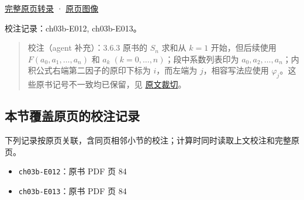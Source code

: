 \documentclass[
  10pt,
  fontset=fandol]{ctexart}
\providecommand{\tightlist}{%
  \setlength{\itemsep}{0pt}\setlength{\parskip}{0pt}}
\begin{document}
\href{../pages/pdf-084.md}{完整原页转录} · \href{../../source-images/pdf-084.jpeg}{原页图像}

校注记录：ch03b-E012, ch03b-E013。

\begin{quote}
校注（agent 补充）：3.6.3 原书的 \(S_n\) 求和从 \(k=1\) 开始，但后续使用 \(F(a_0,a_1,\ldots,a_n)\) 和 \(a_k\;(k=0,\ldots,n)\)；段中系数列表印为 \(a_0,a_2,\ldots,a_n\)；内积公式右端第二因子的原印下标为 \(i\)，而左端为 \(j\)，相容写法应使用 \(\varphi_j\)。这些原书记号不一致均已保留，见 \href{../assets/ch03b/p084-multivariate-formulas.png}{原文裁切}。
\end{quote}

\subsection{本节覆盖原页的校注记录}\label{ux672cux8282ux8986ux76d6ux539fux9875ux7684ux6821ux6ce8ux8bb0ux5f55}

下列记录按原页关联，含同页相邻小节的校注；计算时同时读取上文校注和完整原页。

\begin{itemize}
\tightlist
\item
  \texttt{ch03b-E012}：原书 PDF 页 84
\item
  \texttt{ch03b-E013}：原书 PDF 页 84
\end{itemize}
\end{document}
